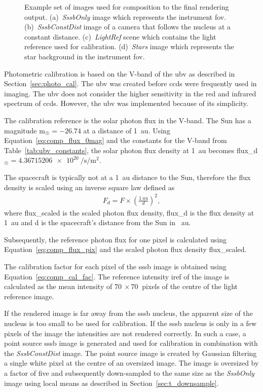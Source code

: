 \begin{figure}[htb]
\begin{subfigure}[b]{0.47\textwidth}
        \caption{}
        \label{fig:comp_stars}
    \end{subfigure}
    \caption{Example set of images used for composition to the final rendering output. (a)~\textit{SssbOnly} image which represents the instrument \gls{fov}. (b)~\textit{SssbConstDist} image of a camera that follows the nucleus at a constant distance. (c)~\textit{LightRef} scene which contains the light reference used for calibration. (d)~\textit{Stars} image which represents the star background in the instrument \gls{fov}.}
    \label{fig:comp_imageset}
\end{figure}

Photometric calibration is based on the V-band of the \gls{ubv} as described in Section~\ref{sec:photo_cal}. The \gls{ubv} was created before \glspl{ccd} were frequently used in imaging. The \gls{ubv} does not consider the higher sensitivity in the red and infrared spectrum of \glspl{ccd}. However, the \gls{ubv} was implemented because of its simplicity.

The calibration reference is the solar photon flux in the V-band. The Sun has a magnitude \gls{m}$_{\astrosun} = -26.74$ at a distance of \SI{1}{au}. Using Equation~\ref{eq:comp_flux_0mag} and the constants for the V-band from Table~\ref{tab:ubv_constants}, the solar photon flux density at \SI{1}{au} becomes \gls{flux_d}$_{\astrosun} = \SI{4.36715206e+20}{\per\second\per\square\meter}$.
 
The spacecraft is typically not at a \SI{1}{au} distance to the Sun, therefore the flux density is scaled using an inverse square law defined as
\begin{align}
    F_d = F \times \left(\frac{\SI{1}{au}}{d}\right)^2, \label{eq:inverse_square}
\end{align}
where \gls{flux_scaled} is the scaled photon flux density, \gls{flux_d} is the flux density at \SI{1}{au} and \gls{d} is the spacecraft's distance from the Sun in \SI{}{au}.

Subsequently, the reference photon flux for one pixel is calculated using Equation~\ref{eq:comp_flux_pix} and the scaled photon flux density \gls{flux_scaled}.

The calibration factor for each pixel of the \gls{sssb} image is obtained using Equation~\ref{eq:comp_cal_fac}. The reference intensity \gls{iref} of the image is calculated as the mean intensity of $\SI{70}{}\times\SI{70}{}$ pixels of the centre of the light reference image.

If the rendered image is far away from the \gls{sssb} nucleus, the apparent size of the nucleus is too small to be used for calibration. If the \gls{sssb} nucleus is only in a few pixels of the image the intensities are not rendered correctly. In such a case, a point source \gls{sssb} image is generated and used for calibration in combination with the \textit{SssbConstDist} image. The point source image is created by Gaussian filtering a single white pixel at the centre of an oversized image. The image is oversized by a factor of five and subsequently down-sampled to the same size as the \textit{SssbOnly} image using local means as described in Section~\ref{sec:t_downsample}.

